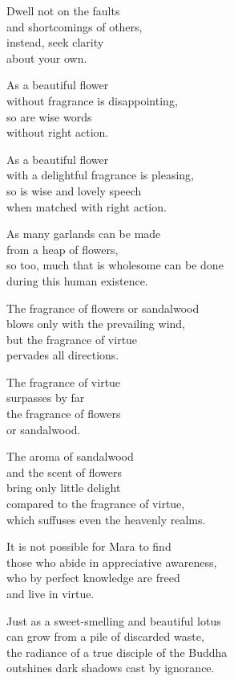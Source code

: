Dwell not on the faults\\
and shortcomings of others,\\
instead, seek clarity\\
about your own.


As a beautiful flower\\
without fragrance is disappointing,\\
so are wise words\\
without right action.



As a beautiful flower\\
with a delightful fragrance is pleasing,\\
so is wise and lovely speech\\
when matched with right action.


As many garlands can be made\\
from a heap of flowers,\\
so too, much that is wholesome can be done\\
during this human existence.


The fragrance of flowers or sandalwood\\
blows only with the prevailing wind,\\
but the fragrance of virtue\\
pervades all directions.


The fragrance of virtue\\
surpasses by far\\
the fragrance of flowers\\
or sandalwood.


The aroma of sandalwood\\
and the scent of flowers\\
bring only little delight\\
compared to the fragrance of virtue,\\
which suffuses even the heavenly realms.


It is not possible for Mara to find\\
those who abide in appreciative awareness,\\
who by perfect knowledge are freed\\
and live in virtue.

Just as a sweet-smelling and beautiful lotus\\
can grow from a pile of discarded waste,\\
the radiance of a true disciple of the Buddha\\
outshines dark shadows cast by ignorance.

